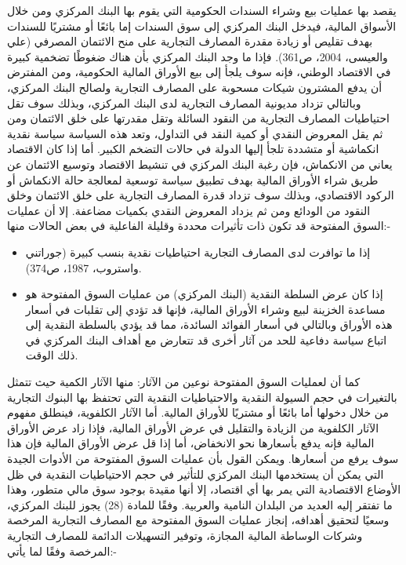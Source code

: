 \documentclass[10pt,a4paper]{report}
\begin{document}
\begin{doublespacing}
\begin{enumerate}
	يقصد بها عمليات بيع وشراء السندات الحكومية التي يقوم بها البنك المركزي ومن خلال الأسواق المالية، فيدخل البنك المركزي إلى سوق السندات إما بائعًا أو مشتريًا للسندات بهدف تقليص أو زيادة مقدرة المصارف التجارية على منح الائتمان المصرفي ({علي والعيسى، 2004، ص361}). فإذا ما وجد البنك المركزي بأن هناك ضغوطًا تضخمية كبيرة في الاقتصاد الوطني، فإنه سوف يلجأ إلى بيع الأوراق المالية الحكومية، ومن المفترض أن يدفع المشترون شيكات مسحوبة على المصارف التجارية ولصالح البنك المركزي، وبالتالي تزداد مديونية المصارف التجارية لدى البنك المركزي، وبذلك سوف تقل احتياطيات المصارف التجارية من النقود السائلة وتقل مقدرتها على خلق الائتمان ومن ثم يقل المعروض النقدي أو كمية النقد في التداول، وتعد هذه السياسة سياسة نقدية انكماشية أو متشددة تلجأ إليها الدولة في حالات التضخم الكبير. أما إذا كان الاقتصاد يعاني من الانكماش، فإن رغبة البنك المركزي في تنشيط الاقتصاد وتوسيع الائتمان عن طريق شراء الأوراق المالية بهدف تطبيق سياسة توسعية لمعالجة حالة الانكماش أو الركود الاقتصادي، وبذلك سوف تزداد قدرة المصارف التجارية على خلق الائتمان وخلق النقود من الودائع ومن ثم يزداد المعروض النقدي بكميات مضاعفة. إلا أن عمليات السوق المفتوحة قد تكون ذات تأثيرات محددة وقليلة الفاعلية في بعض الحالات منها:-
	\begin{itemize}
		\item إذا ما توافرت لدى المصارف التجارية احتياطيات نقدية بنسب كبيرة ({جوراتني واستروب، 1987، ص374}).
		\item إذا كان عرض السلطة النقدية (البنك المركزي) من عمليات السوق المفتوحة هو مساعدة الخزينة لبيع وشراء الأوراق المالية، فإنها قد تؤدي إلى تقلبات في أسعار هذه الأوراق وبالتالي في أسعار الفوائد السائدة، مما قد يؤدي بالسلطة النقدية إلى اتباع سياسة دفاعية للحد من آثار أخرى قد تتعارض مع أهداف البنك المركزي في ذلك الوقت.
	\end{itemize}
	كما أن لعمليات السوق المفتوحة نوعين من الآثار: منها الآثار الكمية حيث تتمثل بالتغيرات في حجم السيولة النقدية والاحتياطيات النقدية التي تحتفظ بها البنوك التجارية من خلال دخولها أما بائعًا أو مشتريًا للأوراق المالية. أما الآثار الكلفوية، فينطلق مفهوم الآثار الكلفوية من الزيادة والتقليل في عرض الأوراق المالية، فإذا زاد عرض الأوراق المالية فإنه يدفع بأسعارها نحو الانخفاض، أما إذا قل عرض الأوراق المالية فإن هذا سوف يرفع من أسعارها. ويمكن القول بأن عمليات السوق المفتوحة من الأدوات الجيدة التي يمكن أن يستخدمها البنك المركزي للتأثير في حجم الاحتياطيات النقدية في ظل الأوضاع الاقتصادية التي يمر بها أي اقتصاد، إلا أنها مقيدة بوجود سوق مالي متطور، وهذا ما تفتقر إليه العديد من البلدان النامية والعربية.
	وفقًا للمادة (28) يجوز للبنك المركزي، وسعيًا لتحقيق أهدافه، إنجاز عمليات السوق المفتوحة مع المصارف التجارية المرخصة وشركات الوساطة المالية المجازة، وتوفير التسهيلات الدائمة للمصارف التجارية المرخصة وفقًا لما يأتي:-

\end{enumerate}
\end{doublespacing}
\end{document}
